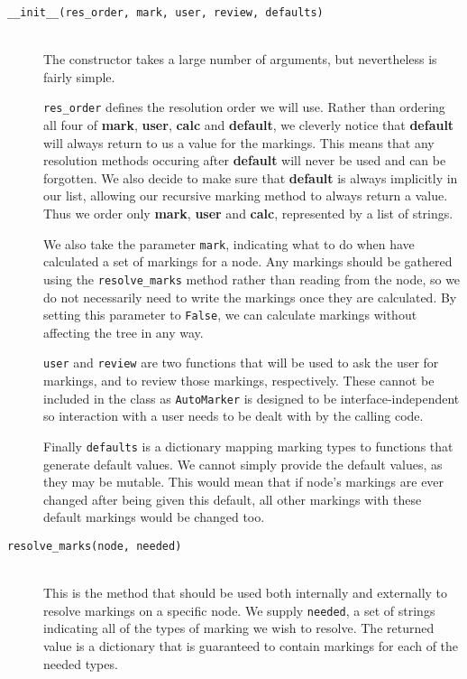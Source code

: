 \documentclass{report}
\begin{document}
\begin{description}
\item[\texttt{\_\_init\_\_(res\_order, mark, user, review, defaults)}] \hfill \\
The constructor takes a large number of arguments, but nevertheless is fairly simple.

\texttt{res\_order} defines the resolution order we will use. Rather than ordering all four of \textbf{mark}, \textbf{user}, \textbf{calc} and
\textbf{default}, we cleverly notice that \textbf{default} will always return to us a value for the markings. This means that any resolution methods
occuring after \textbf{default} will never be used and can be forgotten. We also decide to make sure that \textbf{default} is always implicitly in
our list, allowing our recursive marking method to always return a value. Thus we order only \textbf{mark}, \textbf{user} and \textbf{calc},
represented by a list of strings.

We also take the parameter \texttt{mark}, indicating what to do when have calculated a set of markings for a node. Any markings should be gathered using
the \texttt{resolve\_marks} method rather than reading from the node, so we do not necessarily need to write the markings once they are calculated. By
setting this parameter to \texttt{False}, we can calculate markings without affecting the tree in any way.

\texttt{user} and \texttt{review} are two functions that will be used to ask the user for markings, and to review those markings, respectively. These
cannot be included in the class as \texttt{AutoMarker} is designed to be interface-independent so interaction with a user needs to be dealt with by
the calling code.

Finally \texttt{defaults} is a dictionary mapping marking types to functions that generate default values. We cannot simply provide the default values,
as they may be mutable. This would mean that if node's markings are ever changed after being given this default, all other markings with these default
markings would be changed too.

\item[\texttt{resolve\_marks(node, needed)}] \hfill \\
This is the method that should be used both internally and externally to resolve markings on a specific node. We supply \texttt{needed}, a set of strings
indicating all of the types of marking we wish to resolve. The returned value is a dictionary that is guaranteed to contain markings for each of the
needed types.


\end{description}
\end{document}
